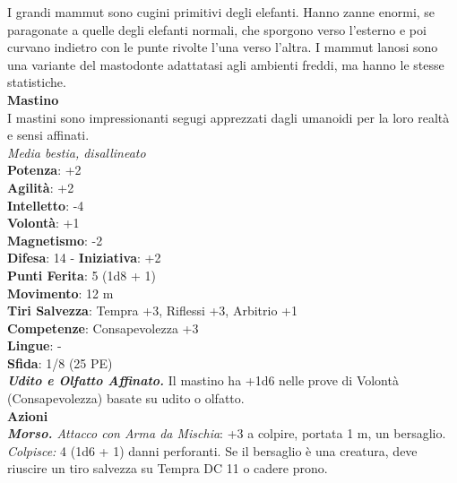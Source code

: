 \begin{multicols}{2}
I grandi mammut sono cugini primitivi degli elefanti. Hanno zanne enormi, se paragonate a quelle degli elefanti normali, che sporgono verso l’esterno e poi curvano indietro con le punte rivolte l’una verso l’altra. I mammut lanosi sono una variante del mastodonte adattatasi agli ambienti freddi, ma hanno le stesse statistiche. \\

\medskip\textbf{Mastino}\\
I mastini sono impressionanti segugi apprezzati dagli umanoidi per la loro realtà e sensi affinati.\\
\emph{Media bestia, disallineato}\\
\textbf{Potenza}: +2\\
\textbf{Agilità}: +2\\
\textbf{Intelletto}: -4\\
\textbf{Volontà}: +1\\
\textbf{Magnetismo}: -2\\
\textbf{Difesa}: 14 - \textbf{Iniziativa}: +2\\
\textbf{Punti Ferita}: 5 (1d8 + 1)\\
\textbf{Movimento}: 12 m\\
\textbf{Tiri Salvezza}: Tempra +3, Riflessi +3, Arbitrio +1 \\
\textbf{Competenze}: Consapevolezza +3\\
\textbf{Lingue}: -\\
\textbf{Sfida}: 1/8 (25 PE)\smallskip\\
\emph{\textbf{Udito e Olfatto Affinato.}} Il mastino ha +1d6 nelle prove di Volontà (Consapevolezza) basate su udito o olfatto.\\
\smallskip\textbf{Azioni}\\
\emph{\textbf{Morso.} Attacco con Arma da Mischia}: +3 a colpire, portata 1 m, un bersaglio.\\
\emph{Colpisce:} 4 (1d6 + 1) danni perforanti. Se il bersaglio è una creatura, deve riuscire un tiro salvezza su Tempra DC 11 o cadere prono.\\


\end{multicols}
